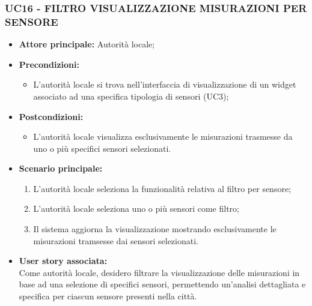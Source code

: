 \subsubsection{UC16 - FILTRO VISUALIZZAZIONE MISURAZIONI PER SENSORE}
\begin{itemize}
    \item \textbf{Attore principale:} Autorità locale;
    \item \textbf{Precondizioni:}
        \begin{itemize}
            \item L'autorità locale si trova nell'interfaccia di visualizzazione di un widget associato ad una specifica tipologia di sensori (UC3);
        \end{itemize}
    \item \textbf{Postcondizioni:}
        \begin{itemize}
            \item L'autorità locale visualizza esclusivamente le misurazioni trasmesse da uno o più specifici sensori selezionati.
        \end{itemize}
    \item \textbf{Scenario principale:}
        \begin{enumerate}
            \item L'autorità locale seleziona la funzionalità relativa al filtro per sensore;
            \item L'autorità locale seleziona uno o più sensori come filtro;
            \item Il sistema aggiorna la visualizzazione mostrando esclusivamente le misurazioni tramsesse dai sensori selezionati.
        \end{enumerate}
    \item \textbf{User story associata:} \\
        Come autorità locale, desidero filtrare la visualizzazione delle misurazioni in base ad una selezione di specifici sensori, permettendo un'analisi dettagliata e specifica per ciascun sensore presenti nella città.
\end{itemize}
